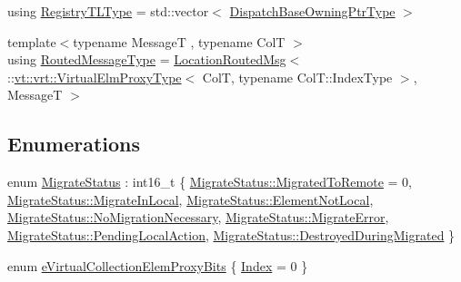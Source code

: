\begin{DoxyCompactItemize}
\item 
using \hyperlink{namespacevt_1_1vrt_1_1collection_aecdad7ed4df3be1bab2a6bb9c5945964}{Registry\+T\+L\+Type} = std\+::vector$<$ \hyperlink{namespacevt_1_1vrt_1_1collection_a124f83d203352b6bccc4f12ca489b68b}{Dispatch\+Base\+Owning\+Ptr\+Type} $>$
\item 
{\footnotesize template$<$typename MessageT , typename ColT $>$ }\\using \hyperlink{namespacevt_1_1vrt_1_1collection_a1bbc628be0955797f2d45227ee526346}{Routed\+Message\+Type} = \hyperlink{namespacevt_a0cb65f2151629893480ef391def4e733}{Location\+Routed\+Msg}$<$ \+::\hyperlink{namespacevt_1_1vrt_a620a5c8c59d13e513f690c74b4af516f}{vt\+::vrt\+::\+Virtual\+Elm\+Proxy\+Type}$<$ ColT, typename Col\+T\+::\+Index\+Type $>$, MessageT $>$
\end{DoxyCompactItemize}
\subsection*{Enumerations}
\begin{DoxyCompactItemize}
\item 
enum \hyperlink{namespacevt_1_1vrt_1_1collection_ad221ad8aea9e586689b4335f5bcd9804}{Migrate\+Status} \+: int16\+\_\+t \{ \newline
\hyperlink{namespacevt_1_1vrt_1_1collection_ad221ad8aea9e586689b4335f5bcd9804a6fcc5f078b0602e1e322782c537538c2}{Migrate\+Status\+::\+Migrated\+To\+Remote} = 0, 
\hyperlink{namespacevt_1_1vrt_1_1collection_ad221ad8aea9e586689b4335f5bcd9804a647a5be7aa591e4cf8c5119f2a3d5634}{Migrate\+Status\+::\+Migrate\+In\+Local}, 
\hyperlink{namespacevt_1_1vrt_1_1collection_ad221ad8aea9e586689b4335f5bcd9804ac91f9652bd569b0888f3c2b24b3a6f62}{Migrate\+Status\+::\+Element\+Not\+Local}, 
\hyperlink{namespacevt_1_1vrt_1_1collection_ad221ad8aea9e586689b4335f5bcd9804a78899246a56068be54717497c5ccc112}{Migrate\+Status\+::\+No\+Migration\+Necessary}, 
\newline
\hyperlink{namespacevt_1_1vrt_1_1collection_ad221ad8aea9e586689b4335f5bcd9804afca2d7bacf50e8f90b444635d97b497f}{Migrate\+Status\+::\+Migrate\+Error}, 
\hyperlink{namespacevt_1_1vrt_1_1collection_ad221ad8aea9e586689b4335f5bcd9804a5470923d68625570211944d98a6a0562}{Migrate\+Status\+::\+Pending\+Local\+Action}, 
\hyperlink{namespacevt_1_1vrt_1_1collection_ad221ad8aea9e586689b4335f5bcd9804a54ee5350e7d23f1bd354973851799599}{Migrate\+Status\+::\+Destroyed\+During\+Migrated}
 \}
\item 
enum \hyperlink{namespacevt_1_1vrt_1_1collection_a216d0b183a155808303b12c258f259a0}{e\+Virtual\+Collection\+Elem\+Proxy\+Bits} \{ \hyperlink{namespacevt_1_1vrt_1_1collection_a216d0b183a155808303b12c258f259a0a0af778d966820c09e81e6d33599fa217}{Index} = 0
 \}
\end{DoxyCompactItemize}

